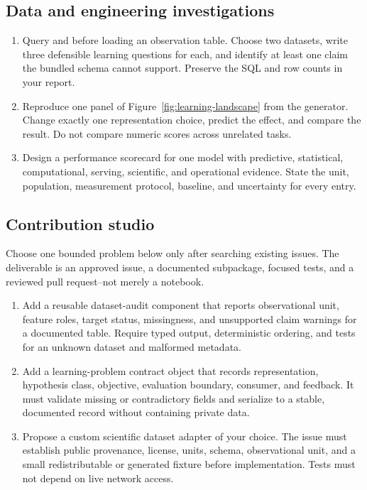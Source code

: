 \subsection*{Data and engineering investigations}

\begin{enumerate}[label=\textbf{MLF-C\arabic*.},leftmargin=*,itemsep=0.65em]
  \item Query  and  before loading
  an observation table. Choose two datasets, write three defensible learning
  questions for each, and identify at least one claim the bundled schema cannot
  support. Preserve the SQL and row counts in your report.
  \item Reproduce one panel of Figure~\ref{fig:learning-landscape} from the
  generator. Change exactly one representation choice, predict the effect, and
  compare the result. Do not compare numeric scores across unrelated tasks.
  \item Design a performance scorecard for one model with predictive,
  statistical, computational, serving, scientific, and operational evidence.
  State the unit, population, measurement protocol, baseline, and uncertainty
  for every entry.
\end{enumerate}

\subsection*{Contribution studio}

Choose one bounded problem below only after searching existing issues. The
deliverable is an approved issue, a documented 
subpackage, focused tests, and a reviewed pull request--not merely a notebook.

\begin{enumerate}[label=\textbf{MLF-PR\arabic*.},leftmargin=*,itemsep=0.65em]
  \item Add a reusable dataset-audit component that reports observational unit,
  feature roles, target status, missingness, and unsupported claim warnings for
  a documented table. Require typed output, deterministic ordering, and tests
  for an unknown dataset and malformed metadata.
  \item Add a learning-problem contract object that records representation,
  hypothesis class, objective, evaluation boundary, consumer, and feedback.
  It must validate missing or contradictory fields and serialize to a stable,
  documented record without containing private data.
  \item Propose a custom scientific dataset adapter of your choice. The issue
  must establish public provenance, license, units, schema, observational unit,
  and a small redistributable or generated fixture before implementation.
  Tests must not depend on live network access.
\end{enumerate}

